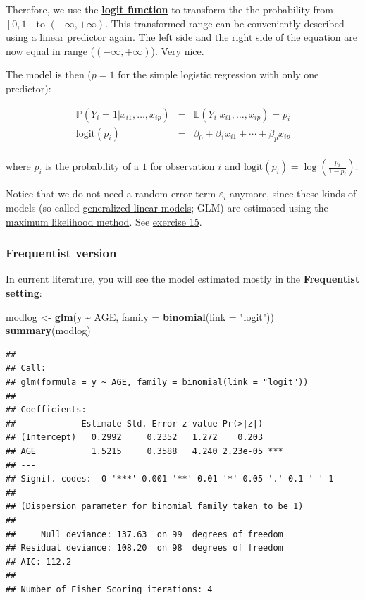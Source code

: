 \documentclass[
]{book}
\newenvironment{Shaded}{\begin{snugshade}}{\end{snugshade}}
\newcommand{\AttributeTok}[1]{\textcolor[rgb]{0.13,0.29,0.53}{#1}}
\newcommand{\FunctionTok}[1]{\textcolor[rgb]{0.13,0.29,0.53}{\textbf{#1}}}
\newcommand{\NormalTok}[1]{#1}
\newcommand{\OtherTok}[1]{\textcolor[rgb]{0.56,0.35,0.01}{#1}}
\newcommand{\SpecialCharTok}[1]{\textcolor[rgb]{0.81,0.36,0.00}{\textbf{#1}}}
\newcommand{\StringTok}[1]{\textcolor[rgb]{0.31,0.60,0.02}{#1}}
\begin{document}
Therefore, we use the \href{https://en.wikipedia.org/wiki/Logit}{\textbf{logit function}} to transform
the the probability from \([0,1]\) to \((-\infty, +\infty)\).
This transformed range can be conveniently described using a linear predictor again.
The left side and the right side of the equation are now equal in range (\((-\infty, +\infty)\)).
Very nice.

The model is then (\(p=1\) for the simple logistic regression with only one predictor):

\[
\begin{array}{rcl}
\mathbb{P}(Y_i = 1 | x_{i1}, \ldots, x_{ip}) &=& \mathbb{E}(Y_i | x_{i1}, \ldots, x_{ip}) = p_i \\
\text{logit}(p_i) &=& \beta_0 + \beta_1 x_{i1} + \cdots + \beta_p x_{ip} \\
\end{array}
\]

where \(p_i\) is the probability of a \(1\) for observation \(i\)
and \(\text{logit}(p_i) = \log\left(\frac{p_i}{1 - p_i}\right)\).

Notice that we do not need a random error term \(\varepsilon_i\) anymore,
since these kinds of models
(so-called \href{https://en.wikipedia.org/wiki/Generalized_linear_model}{generalized linear models}; GLM)
are estimated using the \href{https://en.wikipedia.org/wiki/Maximum_likelihood_estimation}{maximum likelihood method}.
See \hyperref[exercise15_LMM]{exercise 15}.

\subsubsection{Frequentist version}\label{frequentist_logistic}

In current literature, you will see the model estimated mostly in the \textbf{Frequentist setting}:

\begin{Shaded}
\begin{Highlighting}[]
\NormalTok{modlog }\OtherTok{\textless{}{-}} \FunctionTok{glm}\NormalTok{(y }\SpecialCharTok{\textasciitilde{}}\NormalTok{ AGE, }\AttributeTok{family =} \FunctionTok{binomial}\NormalTok{(}\AttributeTok{link =} \StringTok{"logit"}\NormalTok{))}
\FunctionTok{summary}\NormalTok{(modlog)}
\end{Highlighting}
\end{Shaded}

\begin{verbatim}
## 
## Call:
## glm(formula = y ~ AGE, family = binomial(link = "logit"))
## 
## Coefficients:
##             Estimate Std. Error z value Pr(>|z|)    
## (Intercept)   0.2992     0.2352   1.272    0.203    
## AGE           1.5215     0.3588   4.240 2.23e-05 ***
## ---
## Signif. codes:  0 '***' 0.001 '**' 0.01 '*' 0.05 '.' 0.1 ' ' 1
## 
## (Dispersion parameter for binomial family taken to be 1)
## 
##     Null deviance: 137.63  on 99  degrees of freedom
## Residual deviance: 108.20  on 98  degrees of freedom
## AIC: 112.2
## 
## Number of Fisher Scoring iterations: 4
\end{verbatim}
\end{document}
